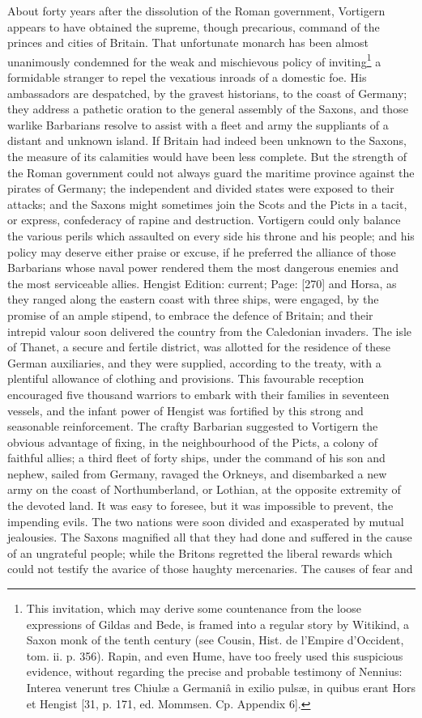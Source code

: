 About forty years after the dissolution of the Roman government, Vortigern appears to have obtained the supreme, though precarious, command of the princes and cities of Britain. That unfortunate monarch has been almost unanimously condemned for the weak and mischievous policy of inviting\footnote{This invitation, which may derive some countenance from the loose expressions of Gildas and Bede, is framed into a regular story by Witikind, a Saxon monk of the tenth century (see Cousin, Hist. de l\texthebrew{}’Empire d\texthebrew{}’Occident, tom. ii. p. 356). Rapin, and even Hume, have too freely used this suspicious evidence, without regarding the precise and probable testimony of Nennius: Interea venerunt tres Chiulæ a Germaniâ in exilio pulsæ, in quibus erant Hors et Hengist [31, p. 171, ed. Mommsen. Cp. Appendix 6].} a formidable stranger to repel the vexatious inroads of a domestic foe. His ambassadors are despatched, by the gravest historians, to the coast of Germany; they address a pathetic oration to the general assembly of the Saxons, and those warlike Barbarians resolve to assist with a fleet and army the suppliants of a distant and unknown island. If Britain had indeed been unknown to the Saxons, the measure of its calamities would have been less complete. But the strength of the Roman government could not always guard the maritime province against the pirates of Germany; the independent and divided states were exposed to their attacks; and the Saxons might sometimes join the Scots and the Picts in a tacit, or express, confederacy of rapine and destruction. Vortigern could only balance the various perils which assaulted on every side his throne and his people; and his policy may deserve either praise or excuse, if he preferred the alliance of those Barbarians whose naval power rendered them the most dangerous enemies and the most serviceable allies. Hengist Edition: current; Page: [270] and Horsa, as they ranged along the eastern coast with three ships, were engaged, by the promise of an ample stipend, to embrace the defence of Britain; and their intrepid valour soon delivered the country from the Caledonian invaders. The isle of Thanet, a secure and fertile district, was allotted for the residence of these German auxiliaries, and they were supplied, according to the treaty, with a plentiful allowance of clothing and provisions. This favourable reception encouraged five thousand warriors to embark with their families in seventeen vessels, and the infant power of Hengist was fortified by this strong and seasonable reinforcement. The crafty Barbarian suggested to Vortigern the obvious advantage of fixing, in the neighbourhood of the Picts, a colony of faithful allies; a third fleet of forty ships, under the command of his son and nephew, sailed from Germany, ravaged the Orkneys, and disembarked a new army on the coast of Northumberland, or Lothian, at the opposite extremity of the devoted land. It was easy to foresee, but it was impossible to prevent, the impending evils. The two nations were soon divided and exasperated by mutual jealousies. The Saxons magnified all that they had done and suffered in the cause of an ungrateful people; while the Britons regretted the liberal rewards which could not testify the avarice of those haughty mercenaries. The causes of fear and 